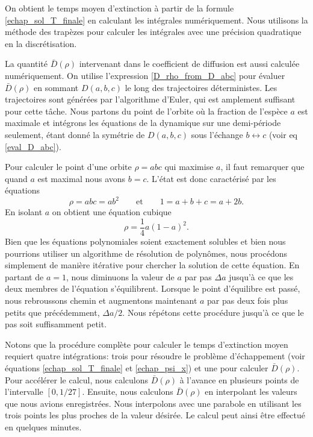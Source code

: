 \documentclass[openany,a4paper,12pt]{article}
\begin{document}
\par On obtient le temps moyen d'extinction à partir de la formule \ref{echap_sol_T_finale} en calculant les intégrales numériquement. Nous utilisons la méthode des trapèzes pour calculer les intégrales avec une précision quadratique en la discrétisation.

\par La quantité $\bar D(\rho)$ intervenant dans le coefficient de diffusion est aussi calculée numériquement. On utilise l'expression \ref{D_rho_from_D_abc} pour évaluer $\bar D(\rho)$ en sommant $D(a,b,c)$ le long des trajectoires déterministes. Les trajectoires sont générées par l'algorithme d'Euler, qui est amplement suffisant pour cette tâche. Nous partons du point de l'orbite où la fraction de l'espèce $a$ est maximale et intégrons les équations de la dynamique sur une demi-période seulement, étant donné la symétrie de $D(a,b,c)$ sous l'échange $b\leftrightarrow c$ (voir eq \ref{eval_D_abc}).

\par Pour calculer le point d'une orbite $\rho = abc$ qui maximise $a$, il faut remarquer que quand $a$ est maximal nous avons $b=c$. L'état est donc caractérisé par les équations 
%
\begin{equation}\label{syst_a_max}
	\rho = abc = ab^2  \qquad \text{et} \qquad 1 = a+b+c = a+2b.
\end{equation}
%
En isolant $a$ on obtient une équation cubique 
%
\begin{equation}\label{eq_a_max}
	\rho = \frac 14 a (1-a)^2.
\end{equation}
%
Bien que les équations polynomiales soient exactement solubles et bien nous pourrions utiliser un algorithme de résolution de polynômes, nous procédons simplement de manière itérative pour chercher la solution de cette équation. En partant de $a=1$, nous diminuons la valeur de $a$ par pas $\Delta a$ jusqu'à ce que les deux membres de l'équation s'équilibrent. Lorsque le point d'équilibre est passé, nous rebroussons chemin et augmentons maintenant $a$ par pas deux fois plus petits que précédemment, $\Delta a /2$. Nous répétons cette procédure jusqu'à ce que le pas soit suffisamment petit.

\par Notons que la procédure complète pour calculer le temps d'extinction moyen requiert quatre intégrations: trois pour résoudre le problème d'échappement (voir équations \ref{echap_sol_T_finale} et \ref{echap_psi_x}) et une pour calculer $\bar D(\rho)$. Pour accélérer le calcul, nous calculons $\bar D(\rho)$ à l'avance en plusieurs points de l'intervalle $[0,1/27]$. Ensuite, nous calculons $\bar D(\rho)$ en interpolant les valeurs que nous avions enregistrées. Nous interpolons avec une parabole en utilisant les trois points les plus proches de la valeur désirée. Le calcul peut ainsi être effectué en quelques minutes.
\end{document}
